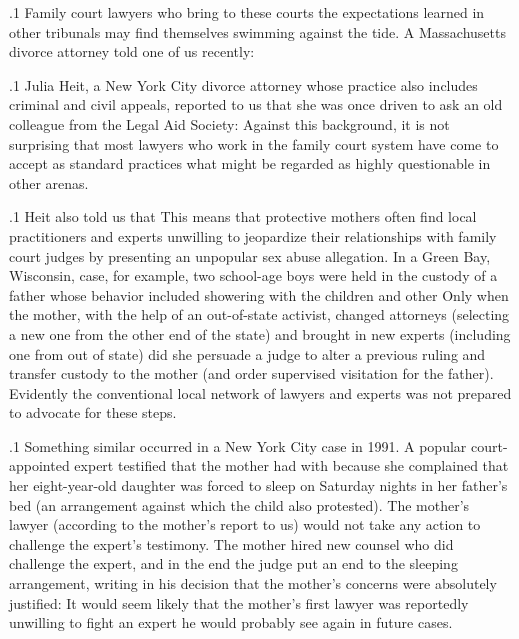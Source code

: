 \documentclass[11pt, twoside]{article}
\begin{document}
{\p.1{%
\:Family court lawyers who bring to these courts the expectations
learned in other tribunals may find themselves swimming against the
tide. A Massachusetts divorce attorney told one of us recently: \;
}%

\p.1{%
\:Julia Heit, a New York City divorce attorney whose practice also includes criminal and civil appeals, reported to us that she was once driven
to ask an old colleague from the Legal Aid Society:  Against
this background, it is not surprising that most lawyers who work in
the family court system have come to accept as standard practices what
might be regarded as highly questionable in other arenas.\;
}%

\p.1{%
\:Heit also told us that  This
means that protective mothers often find local practitioners and experts
unwilling to jeopardize their relationships with family court judges by
presenting an unpopular sex abuse allegation. In a Green Bay, Wisconsin, case, for example, two school-age boys were held in the custody
of a father whose behavior included showering with the children and
other  Only when the mother, with the help of an out-of-state activist,
changed attorneys (selecting a new one from the other end of the state)
and brought in new experts (including one from out of state) did she
persuade a judge to alter a previous ruling and transfer custody to the
mother (and order supervised visitation for the father). Evidently the
conventional local network of lawyers and experts was not prepared to
advocate for these steps.\;
}%

\p.1{%
\:Something similar occurred in a New York City case in 1991. A popular court-appointed expert testified that the mother had  with  because she complained that her eight-year-old daughter was forced to sleep on Saturday
nights in her father’s bed (an arrangement against which the child also
protested). The mother’s lawyer (according to the mother’s report to
us) would not take any action to challenge the expert’s testimony. The
mother hired new counsel who did challenge the expert, and in the end
the judge put an end to the sleeping arrangement, writing in his decision
that the mother’s concerns were absolutely justified:  It would seem likely
that the mother’s first lawyer was reportedly unwilling to fight an expert
he would probably see again in future cases.\;
}%

}
\end{document}
